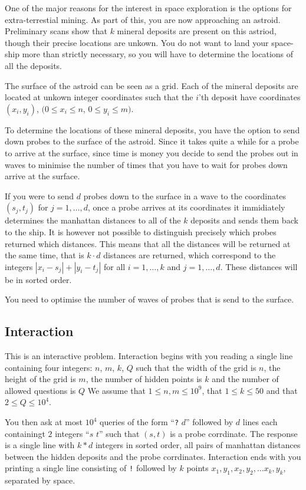 One of the major reasons for the interest in space exploration is the options for extra-terrestial mining. 
As part of this, you are now approaching an astroid. Preliminary scans show that $k$ mineral deposits are present on this astriod, though their precise locations are unkown.
You do not want to land your space-ship more than strictly necessary, so you will have to determine the locations of all the deposits.

\medskip

The surface of the astroid can be seen as a grid.
Each of the mineral deposits are located at unkown integer coordinates such that the $i$'th deposit have coordinates $(x_i,y_i)$, $(0 \le x_i \le n$, $0\le y_i \le m)$.

To determine the locations of these mineral deposits, you have the option to send down probes to the surface of the astroid. 
Since it takes quite a while for a probe to arrive at the surface, since time is money you decide to send the probes out in waves to minimise the number of times that you have to wait for probes down arrive at the surface.

If you were to send $d$ probes down to the surface in a wave to the coordinates $(s_j,t_j)$ for $j=1,\ldots,d$, once a probe arrives at its coordinates it immidiately determines the manhattan distances to all of the $k$ deposits and sends them back to the ship. 
It is however not possible to distinguish precisely which probes returned which distances. 
This means that all the distances will be returned at the same time, that is $k\cdot d$ distances are returned, which correspond to the integers $|x_i-s_j| + |y_i - t_j|$ for all $i = 1,\ldots,k$ and $j = 1,\ldots,d$.
These distances will be in sorted order.

You need to optimise the number of waves of probes that is send to the surface.
\subsection*{Interaction}

This is an interactive problem.
Interaction begins with you reading a single line containing four integers: $n$, $m$, $k$, $Q$ such that the width of the grid is $n$, 
the height of the grid is $m$, the number of hidden points is $k$ and the number of allowed questions is $Q$
We assume that $1\leq n,m\leq 10^9$, that $1 \leq k \leq 50$ and that $2 \le Q \le 10^4$.

You then ask at most $10^4$ queries of the form ``\texttt{?} $d$'' followed by $d$ lines each containingt $2$ integers ``$s$ $t$'' such that $(s,t)$ is a probe corrdinate.
The response is a single line with $k *d$ integers in sorted order, all pairs of manhattan distances between the hidden deposits and the probe corrdinates.
Interaction ends with you printing a single line consisting of \texttt{!} followed by $k$ points $x_1, y_1, x_2, y_2, \ldots x_k, y_k$, separated by space.

